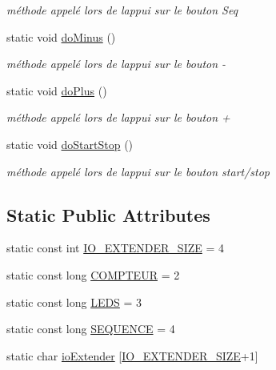 \begin{DoxyCompactItemize}
\begin{DoxyCompactList}\small\item\em méthode appelé lors de l\textquotesingle{}appui sur le bouton Seq \end{DoxyCompactList}\item 
static void \hyperlink{class_salf_box_ihm_a21fa5d5d54ae0e93285dd5a20f832eba}{do\+Minus} ()
\begin{DoxyCompactList}\small\item\em méthode appelé lors de l\textquotesingle{}appui sur le bouton -\/ \end{DoxyCompactList}\item 
static void \hyperlink{class_salf_box_ihm_a8501840e90de2416c2a66a60566d8d59}{do\+Plus} ()
\begin{DoxyCompactList}\small\item\em méthode appelé lors de l\textquotesingle{}appui sur le bouton + \end{DoxyCompactList}\item 
static void \hyperlink{class_salf_box_ihm_ad5bc73201b44237264423a15596a0520}{do\+Start\+Stop} ()
\begin{DoxyCompactList}\small\item\em méthode appelé lors de l\textquotesingle{}appui sur le bouton start/stop \end{DoxyCompactList}\end{DoxyCompactItemize}
\subsection*{Static Public Attributes}
\begin{DoxyCompactItemize}
\item 
static const int \hyperlink{class_salf_box_ihm_a18d938d3fb8caaa41d3ac73ff1b44528}{I\+O\+\_\+\+E\+X\+T\+E\+N\+D\+E\+R\+\_\+\+S\+I\+ZE} = 4
\item 
static const long \hyperlink{class_salf_box_ihm_a17f893cfff5ab3325fa77896a3ce9650}{C\+O\+M\+P\+T\+E\+UR} = 2
\item 
static const long \hyperlink{class_salf_box_ihm_a7e0bc33d7cce75be082ca75bac2f28da}{L\+E\+DS} = 3
\item 
static const long \hyperlink{class_salf_box_ihm_a0e994adbb9f92e763100e01f5faa3747}{S\+E\+Q\+U\+E\+N\+CE} = 4
\item 
static char \hyperlink{class_salf_box_ihm_a93253b04921128f64d671919aa49c81f}{io\+Extender} \mbox{[}\hyperlink{class_salf_box_ihm_a18d938d3fb8caaa41d3ac73ff1b44528}{I\+O\+\_\+\+E\+X\+T\+E\+N\+D\+E\+R\+\_\+\+S\+I\+ZE}+1\mbox{]}
\end{DoxyCompactItemize}


